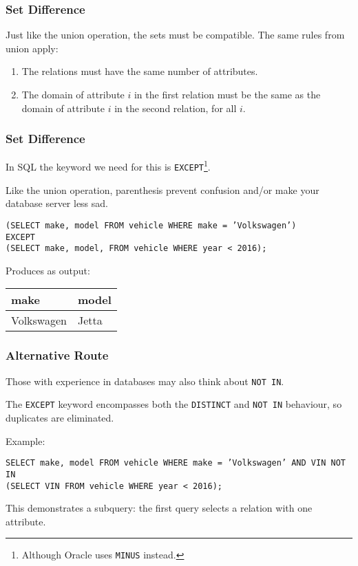 \begin{frame}
\frametitle{Set Difference}

Just like the union operation, the sets must be compatible. The same rules from union apply: 

\begin{enumerate}
	\item The relations must have the same number of attributes.
	\item The domain of attribute $i$ in the first relation must be the same as the domain of attribute $i$ in the second relation, for all $i$. 
\end{enumerate}

\end{frame}



\begin{frame}
\frametitle{Set Difference}

In SQL the keyword we need for this is \texttt{EXCEPT}\footnote{Although Oracle uses \texttt{MINUS} instead.}. 

Like the union operation, parenthesis prevent confusion and/or make your database server less sad.

\texttt{(SELECT make, model FROM vehicle WHERE make = 'Volkswagen')\\
EXCEPT\\
(SELECT make, model, FROM vehicle WHERE year < 2016);}

Produces as output: 

\begin{center}
\begin{tabular}{|l|l|} \hline
\textbf{make} & \textbf{model} \\ \hline
	Volkswagen & Jetta  \\ \hline
\end{tabular}
\end{center}

\end{frame}



\begin{frame}
\frametitle{Alternative Route}

Those with experience in databases may also think about \texttt{NOT IN}. 

The \texttt{EXCEPT} keyword encompasses both the \texttt{DISTINCT} and \texttt{NOT IN} behaviour, so duplicates are eliminated. 

Example:

\texttt{SELECT make, model FROM vehicle WHERE make = 'Volkswagen' AND 
VIN NOT IN\\ (SELECT VIN FROM vehicle WHERE year < 2016);}

This demonstrates a subquery: the first query selects a relation with one attribute.  

\end{frame}



